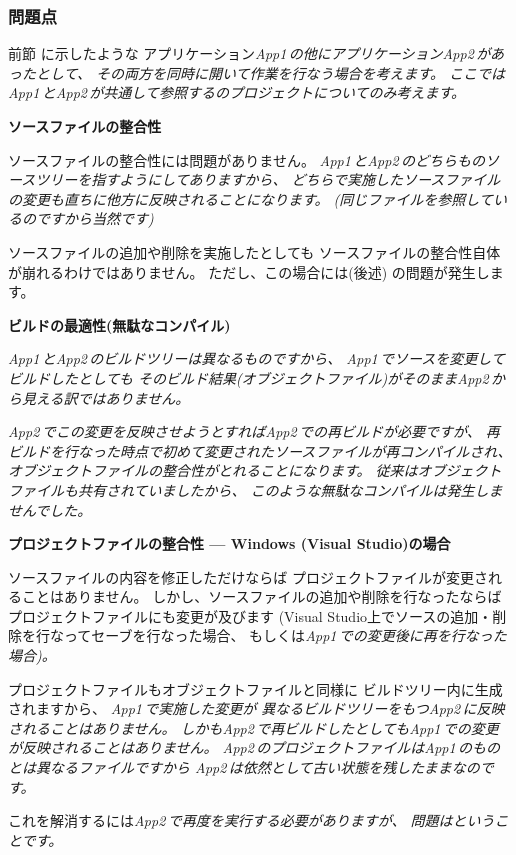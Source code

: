 \subsubsection{問題点}
\label{subsubsec:Problems}
\parindent=0pt

\def\App#1{\it{App#1\,}}
\def\App#1{\it{App#1\,}}

前節 に示したような
アプリケーション\App{1}の他にアプリケーション\App{2}があったとして、
その両方を同時に開いて作業を行なう場合を考えます。
ここでは\App{1}と\App{2}が共通して参照する\SprLib のプロジェクトについてのみ考えます。

\bigskip
\bf{ソースファイルの整合性}
\begin{narrow}[20pt]
	ソースファイルの整合性には問題がありません。
	\App{1}と\App{2}のどちらも\SprLib のソースツリーを指すようにしてありますから、
	どちらで実施したソースファイルの変更も直ちに他方に反映されることになります。
	(同じファイルを参照しているのですから当然です)

	\medskip
	ソースファイルの追加や削除を実施したとしても
	ソースファイルの整合性自体が崩れるわけではありません。
	ただし、この場合には(後述)
	の問題が発生します。
\end{narrow}

\medskip
\bf{ビルドの最適性(無駄なコンパイル)}
\begin{narrow}[20pt]
	\App{1}と\App{2}のビルドツリーは異なるものですから、
	\App{1}でソースを変更してビルドしたとしても
	そのビルド結果(オブジェクトファイル)がそのまま\App{2}から見える訳ではありません。

	\medskip
	\App{2}でこの変更を反映させようとすれば\App{2}での再ビルドが必要ですが、
	再ビルドを行なった時点で初めて変更されたソースファイルが再コンパイルされ、
	オブジェクトファイルの整合性がとれることになります。
	従来はオブジェクトファイルも共有されていましたから、
	このような無駄なコンパイルは発生しませんでした。
\end{narrow}

\medskip
\bf{プロジェクトファイルの整合性 --- Windows (Visual Studio)の場合}
\label{subsec:Problems:ProjectFileIntegration}
\begin{narrow}[20pt]
	ソースファイルの内容を修正しただけならば
	プロジェクトファイルが変更されることはありません。
	しかし、ソースファイルの追加や削除を行なったならば
	プロジェクトファイルにも変更が及びます
	(Visual Studio上でソースの追加・削除を行なってセーブを行なった場合、
	もしくは\App{1}での変更後に再\cmake を行なった場合)。

	\medskip
	プロジェクトファイルもオブジェクトファイルと同様に
	ビルドツリー内に生成されますから、
	\App{1}で実施した変更が
	異なるビルドツリーをもつ\App{2}に反映されることはありません。
	しかも\App{2}で再ビルドしたとしても\App{1}での変更が反映されることはありません。
	\App{2}のプロジェクトファイルは\App{1}のものとは異なるファイルですから
	\App{2}は依然として古い状態を残したままなのです。

	\medskip
	これを解消するには\App{2}で再度\cmake を実行する必要がありますが、
	問題はということです。
\end{narrow}

